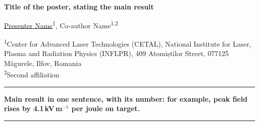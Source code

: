 \documentclass[final]{beamer}
\newcommand{\postertitle}{\cetaltitlefont\fontsize{84}{98}\selectfont\bfseries}
\newcommand{\posterauthors}{\fontsize{40}{48}\selectfont}
\newcommand{\postersmall}{\fontsize{19}{24}\selectfont}
\begin{document}
\begin{frame}[t]
\vspace{2.2cm}

\hspace{2.75cm}%
\begin{minipage}[t]{\dimexpr\paperwidth-5.5cm\relax}
  \vspace{1.2cm}
  \cetallockup[2.6cm]\par
  \vspace{2.2cm}
  {\postertitle\color{cetalprimary}Title of the poster, stating the main result\par}
  \vspace{1cm}
  {\posterauthors\underline{Presenter Name}\textsuperscript{1}, Co-author Name\textsuperscript{1,2}\par}
  \vspace{0.5cm}
  {\postersmall\color{cetalgrey}
    \textsuperscript{1}Center for Advanced Laser Technologies (CETAL), National Institute for Laser, Plasma and Radiation Physics (INFLPR), 409 Atomiștilor Street, 077125 Măgurele, Ilfov, Romania\\
    \textsuperscript{2}Second affiliation\par}
  \vspace{1.4cm}
  \par

  \vspace{1.6cm}
  {\color{cetalprimary}\rule{\linewidth}{1.5pt}}\par\vspace{0.8cm}
  {\fontsize{38}{48}\selectfont\bfseries Main result in one sentence, with its number: for example, peak field rises by 4.1\,kV\,m\(^{-1}\) per joule on target.\par}
  \vspace{0.8cm}
  {\color{cetalprimary}\rule{\linewidth}{1.5pt}}\par


\end{minipage}
\end{frame}
\end{document}
